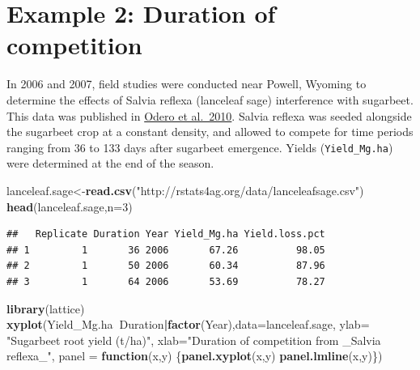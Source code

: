 \documentclass[letterpaper,]{book}
\newenvironment{Shaded}{\begin{snugshade}}{\end{snugshade}}
\newcommand{\ControlFlowTok}[1]{\textcolor[rgb]{0.13,0.29,0.53}{\textbf{#1}}}
\newcommand{\DataTypeTok}[1]{\textcolor[rgb]{0.13,0.29,0.53}{#1}}
\newcommand{\DecValTok}[1]{\textcolor[rgb]{0.00,0.00,0.81}{#1}}
\newcommand{\KeywordTok}[1]{\textcolor[rgb]{0.13,0.29,0.53}{\textbf{#1}}}
\newcommand{\NormalTok}[1]{#1}
\newcommand{\OperatorTok}[1]{\textcolor[rgb]{0.81,0.36,0.00}{\textbf{#1}}}
\newcommand{\StringTok}[1]{\textcolor[rgb]{0.31,0.60,0.02}{#1}}
\begin{document}
\hypertarget{example-2-duration-of-competition}{%
\section{Example 2: Duration of competition}\label{example-2-duration-of-competition}}

In 2006 and 2007, field studies were conducted near Powell, Wyoming to determine the effects of Salvia reflexa (lanceleaf sage) interference with sugarbeet. This data was published in \href{http://www.bioone.org/doi/abs/10.1614/WT-D-10-00015.1}{Odero et al.~2010}. Salvia reflexa was seeded alongside the sugarbeet crop at a constant density, and allowed to compete for time periods ranging from 36 to 133 days after sugarbeet emergence. Yields (\texttt{Yield\_Mg.ha}) were determined at the end of the season.

\begin{Shaded}
\begin{Highlighting}[]
\NormalTok{lanceleaf.sage<-}\KeywordTok{read.csv}\NormalTok{(}\StringTok{"http://rstats4ag.org/data/lanceleafsage.csv"}\NormalTok{)}
\KeywordTok{head}\NormalTok{(lanceleaf.sage,}\DataTypeTok{n=}\DecValTok{3}\NormalTok{)}
\end{Highlighting}
\end{Shaded}

\begin{verbatim}
##   Replicate Duration Year Yield_Mg.ha Yield.loss.pct
## 1         1       36 2006       67.26          98.05
## 2         1       50 2006       60.34          87.96
## 3         1       64 2006       53.69          78.27
\end{verbatim}



\begin{Shaded}
\begin{Highlighting}[]
\KeywordTok{library}\NormalTok{(lattice)}
\KeywordTok{xyplot}\NormalTok{(Yield_Mg.ha}\OperatorTok{~}\NormalTok{Duration}\OperatorTok{|}\KeywordTok{factor}\NormalTok{(Year),}\DataTypeTok{data=}\NormalTok{lanceleaf.sage,}
        \DataTypeTok{ylab=} \StringTok{"Sugarbeet root yield (t/ha)"}\NormalTok{,}
        \DataTypeTok{xlab=}\StringTok{"Duration of competition from _Salvia reflexa_"}\NormalTok{,}
        \DataTypeTok{panel =} \ControlFlowTok{function}\NormalTok{(x,y)}
\NormalTok{       \{}\KeywordTok{panel.xyplot}\NormalTok{(x,y)}
        \KeywordTok{panel.lmline}\NormalTok{(x,y)\})}
\end{Highlighting}
\end{Shaded}
\end{document}
